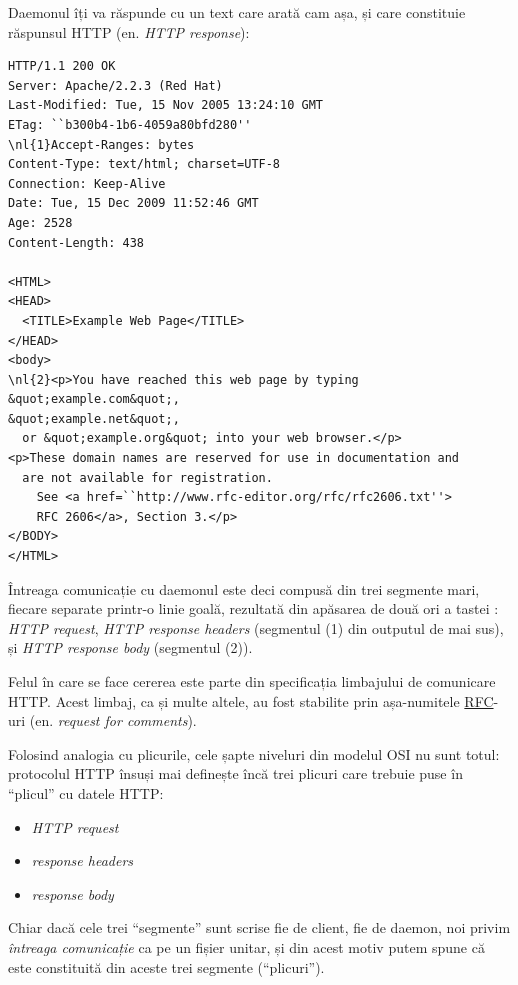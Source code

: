 Daemonul îți va răspunde cu un text care arată cam așa, și care constituie răspunsul
HTTP (en. \textsl{HTTP response}):
\begin{Verbatim}[commandchars=\\\{\}]
HTTP/1.1 200 OK
Server: Apache/2.2.3 (Red Hat)
Last-Modified: Tue, 15 Nov 2005 13:24:10 GMT
ETag: ``b300b4-1b6-4059a80bfd280''            
\nl{1}Accept-Ranges: bytes                        
Content-Type: text/html; charset=UTF-8      
Connection: Keep-Alive                      
Date: Tue, 15 Dec 2009 11:52:46 GMT         
Age: 2528                                   
Content-Length: 438

<HTML>
<HEAD>
  <TITLE>Example Web Page</TITLE>
</HEAD>                          
<body>                           
\nl{2}<p>You have reached this web page by typing &quot;example.com&quot;,
&quot;example.net&quot;,                                            
  or &quot;example.org&quot; into your web browser.</p>             
<p>These domain names are reserved for use in documentation and
  are not available for registration.
    See <a href=``http://www.rfc-editor.org/rfc/rfc2606.txt''>
    RFC 2606</a>, Section 3.</p>        
</BODY>                                                                           
</HTML>
\end{Verbatim}
Întreaga comunicație cu daemonul este deci compusă din trei segmente mari, fiecare separate
printr-o linie goală, rezultată din apăsarea de două ori a tastei :
\textsl{HTTP request}, \textsl{HTTP response headers} (segmentul (1) din outputul de mai sus),
și \textsl{HTTP response body} (segmentul (2)).

Felul în care se face cererea este parte din specificația
limbajului de comunicare HTTP. Acest limbaj, ca și multe altele, au fost stabilite
prin așa-numitele \href{http://en.wikipedia.org/wiki/Request_for_Comments}{RFC}-uri
(en. \textsl{request for comments}).

Folosind analogia cu plicurile, cele șapte niveluri din modelul OSI nu sunt totul:
protocolul HTTP însuși mai definește încă trei plicuri care trebuie puse în
``plicul'' cu datele HTTP:
\begin{itemize}
\item \textsl{HTTP request}
\item \textsl{response headers}
\item \textsl{response body}
\end{itemize}
Chiar dacă cele trei ``segmente'' sunt scrise fie de client, fie de daemon,
noi privim \textit{întreaga comunicație} ca pe un fișier unitar, și din acest motiv
putem spune că este constituită din aceste trei segmente (``plicuri'').

